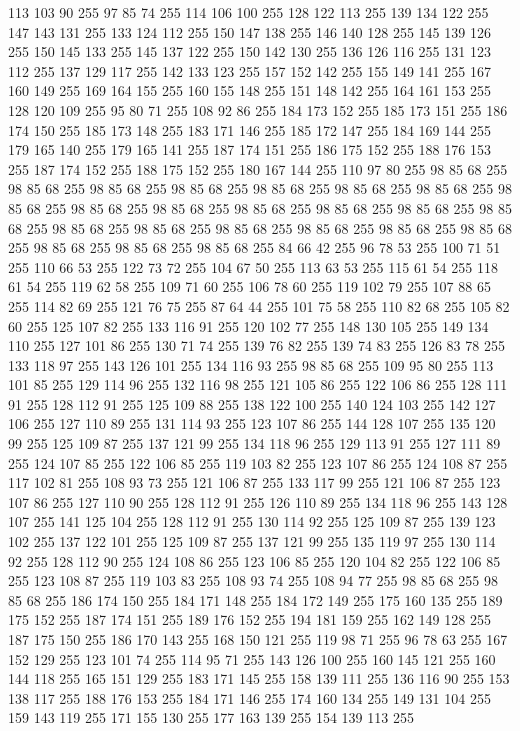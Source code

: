 113 103 90 255 97 85 74 255 114 106 100 255 128 122 113 255 139 134 122 255 147 143 131 255 133 124 112 255 150 147 138 255 146 140 128 255 145 139 126 255 150 145 133 255 145 137 122 255 150 142 130 255 136 126 116 255 131 123 112 255 137 129 117 255 142 133 123 255 157 152 142 255 155 149 141 255 167 160 149 255 169 164 155 255 160 155 148 255 151 148 142 255 164 161 153 255 128 120 109 255 95 80 71 255 108 92 86 255 184 173 152 255 185 173 151 255 186 174 150 255 185 173 148 255 183 171 146 255 185 172 147 255 184 169 144 255 179 165 140 255 179 165 141 255 187 174 151 255 186 175 152 255 188 176 153 255 187 174 152 255 188 175 152 255 180 167 144 255 110 97 80 255 98 85 68 255 98 85 68 255 98 85 68 255 98 85 68 255 98 85 68 255 98 85 68 255 98 85 68 255 98 85 68 255 98 85 68 255 98 85 68 255 98 85 68 255 98 85 68 255 98 85 68 255 98 85 68 255 98 85 68 255 98 85 68 255 98 85 68 255 98 85 68 255 98 85 68 255 98 85 68 255 98 85 68 255
98 85 68 255 98 85 68 255 84 66 42 255 96 78 53 255 100 71 51 255 110 66 53 255 122 73 72 255 104 67 50 255 113 63 53 255 115 61 54 255 118 61 54 255 119 62 58 255 109 71 60 255 106 78 60 255 119 102 79 255 107 88 65 255 114 82 69 255 121 76 75 255 87 64 44 255 101 75 58 255 110 82 68 255 105 82 60 255 125 107 82 255 133 116 91 255 120 102 77 255 148 130 105 255 149 134 110 255 127 101 86 255 130 71 74 255 139 76 82 255 139 74 83 255 126 83 78 255 133 118 97 255 143 126 101 255 134 116 93 255 98 85 68 255 109 95 80 255 113 101 85 255 129 114 96 255 132 116 98 255 121 105 86 255 122 106 86 255 128 111 91 255 128 112 91 255 125 109 88 255 138 122 100 255 140 124 103 255 142 127 106 255 127 110 89 255 131 114 93 255 123 107 86 255 144 128 107 255 135 120 99 255 125 109 87 255 137 121 99 255 134 118 96 255 129 113 91 255 127 111 89 255 124 107 85 255 122 106 85 255 119 103 82 255 123 107 86 255 124 108 87 255 117 102 81 255
108 93 73 255 121 106 87 255 133 117 99 255 121 106 87 255 123 107 86 255 127 110 90 255 128 112 91 255 126 110 89 255 134 118 96 255 143 128 107 255 141 125 104 255 128 112 91 255 130 114 92 255 125 109 87 255 139 123 102 255 137 122 101 255 125 109 87 255 137 121 99 255 135 119 97 255 130 114 92 255 128 112 90 255 124 108 86 255 123 106 85 255 120 104 82 255 122 106 85 255 123 108 87 255 119 103 83 255 108 93 74 255 108 94 77 255 98 85 68 255 98 85 68 255 186 174 150 255 184 171 148 255 184 172 149 255 175 160 135 255 189 175 152 255 187 174 151 255 189 176 152 255 194 181 159 255 162 149 128 255 187 175 150 255 186 170 143 255 168 150 121 255 119 98 71 255 96 78 63 255 167 152 129 255 123 101 74 255 114 95 71 255 143 126 100 255 160 145 121 255 160 144 118 255 165 151 129 255 183 171 145 255 158 139 111 255 136 116 90 255 153 138 117 255 188 176 153 255 184 171 146 255 174 160 134 255 149 131 104 255 159 143 119 255 171 155 130 255 177 163 139 255 154 139 113 255
